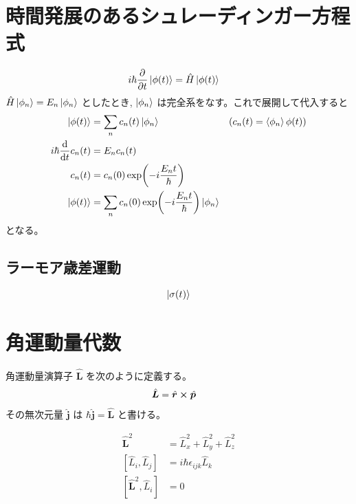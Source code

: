 \documentclass[uplatex,dvipdfmx,a4paper,11pt]{jlreq}
\newcommand{\rr}{\bm{r}}
\newcommand{\pp}{\bm{p}}
\theoremstyle{definition}
\begin{document}
\section{時間発展のあるシュレーディンガー方程式}
\begin{align}
  i\hbar\pdv{t}\ket{\phi(t)} & = \hat{H}\ket{\phi(t)}
\end{align}
$\hat{H}\ket{\phi_n} = E_n\ket{\phi_n}$ としたとき, $\ket{\phi_n}$ は完全系をなす。これで展開して代入すると
\begin{align}
  \ket{\phi(t)}      & = \sum_nc_n(t)\ket{\phi_n}                           & \qty(c_n(t) = \braket{\phi_n}{\phi(t)}) \\
  i\hbar\dv{t}c_n(t) & = E_nc_n(t)                                                                                    \\
  c_n(t)             & = c_n(0)\exp(-i\frac{E_nt}{\hbar})                                                             \\
  \ket{\phi(t)}      & = \sum_nc_n(0)\exp(-i\frac{E_nt}{\hbar})\ket{\phi_n}
\end{align}
となる。


\subsection{ラーモア歳差運動}
\begin{align}
  \ket{\sigma(t)}
\end{align}



\section{角運動量代数}
\begin{definition}
  角運動量演算子 $\hat{\bm{L}}$ を次のように定義する。
  \begin{align}
    \hat{\bm{L}} & = \hat{\rr}\cross\hat{\pp}
  \end{align}
  その無次元量 $\hat{\bm{j}}$ は $\hbar\hat{\bm{j}} = \hat{\bm{L}}$ と書ける。
\end{definition}

\begin{proposition}
  \begin{align}
    \hat{\bm{L}}^2              & = \hat{L}_x^2 + \hat{L}_y^2 + \hat{L}_z^2 \\
    [\hat{L}_i, \hat{L}_j]      & = i\hbar\epsilon_{ijk}\hat{L}_k           \\
    [\hat{\bm{L}}^2, \hat{L}_i] & = 0
  \end{align}
\end{proposition}
\end{document}
